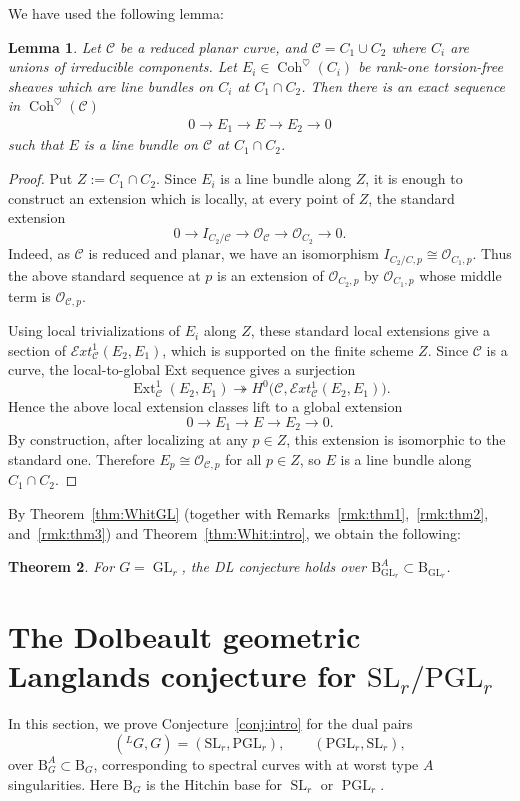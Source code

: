 \documentclass[11pt,oneside,a4paper,mathscr]{amsart}
\newtheorem{thm}{Theorem}[section]
\newtheorem{lemma}[thm]{Lemma}
\theoremstyle{definition}
\newcommand{\cC}{\mathcal{C}}
\newcommand{\rB}{\mathrm{B}}
\newcommand{\Coh}{\operatorname{Coh}}
\newcommand{\Ext}{\operatorname{Ext}}
\newcommand{\GL}{\operatorname{GL}}
\newcommand{\SL}{\operatorname{SL}}
\newcommand{\PGL}{\operatorname{PGL}}
\begin{document}
We have used the following lemma: 
\begin{lemma}\label{lem:line}
Let $\cC$ be a reduced planar curve, and $\cC=C_1 \cup C_2$
where $C_i$ are unions of irreducible components. 
Let $E_i \in \Coh^{\heartsuit}(C_i)$ be rank-one torsion-free 
sheaves which are line bundles on $C_i$ at $C_1 \cap C_2$. Then 
there is an exact sequence in $\Coh^{\heartsuit}(\cC)$
\begin{align*}
    0\to E_1 \to E \to E_2 \to 0
\end{align*}
such that $E$ is a line bundle on $\cC$ at $C_1 \cap C_2$. 
\end{lemma}
\begin{proof}
Put $Z:=C_1\cap C_2$.  Since $E_i$ is a line bundle along $Z$, it is
enough to construct an extension which is locally, at every point of
$Z$, the standard extension
\[
0\to I_{C_2/\cC}\to \mathcal O_{\cC}\to \mathcal O_{C_2}\to 0 .
\]
Indeed, as $\cC$ is reduced and planar, 
we have an isomorphism $I_{C_2/C, p} \cong \mathcal{O}_{C_1, p}$. 
Thus the above standard sequence at $p$ is an extension of
$\mathcal O_{C_2,p}$ by $\mathcal O_{C_1,p}$ whose middle term is
$\mathcal O_{\cC,p}$.

Using local trivializations of $E_i$ along $Z$, these standard local
extensions give a section of
$
\mathcal Ext^1_{\cC}(E_2,E_1)$, 
which is supported on the finite scheme $Z$.  Since $\cC$ is a curve,
the local-to-global Ext sequence gives a surjection
\[
\Ext^1_{\cC}(E_2,E_1)
\twoheadrightarrow
H^0\bigl(\cC,\mathcal Ext^1_{\cC}(E_2,E_1)\bigr).
\]
Hence the above local extension classes lift to a global extension
\[
0\to E_1\to E\to E_2\to 0 .
\]
By construction, after localizing at any $p\in Z$, this extension is
isomorphic to the standard one.  Therefore
$E_p\cong \mathcal O_{\cC,p}$ for all $p\in Z$, so $E$ is a line bundle
along $C_1\cap C_2$.
\end{proof}
By Theorem~\ref{thm:WhitGL} (together with Remarks~\ref{rmk:thm1},~\ref{rmk:thm2}, and~\ref{rmk:thm3}) and Theorem~\ref{thm:Whit:intro}, we obtain the following: 
\begin{thm}\label{thm:GL}
    For $G=\GL_r$, the DL conjecture holds over $\rB_{\GL_r}^A \subset \rB_{\GL_r}$.
\end{thm}

\section[The Dolbeault geometric Langlands conjecture for SLr/PGLr]{The Dolbeault geometric Langlands conjecture for \texorpdfstring{$\mathrm{SL}_r/\mathrm{PGL}_r$}{SLr/PGLr}}
In this section, we prove Conjecture~\ref{conj:intro} for the dual pairs
\[
({}^{L}G,G)=(\mathrm{SL}_r,\mathrm{PGL}_r),\qquad
(\mathrm{PGL}_r,\mathrm{SL}_r),
\]
over $\rB_{G}^{A}\subset \rB_{G}$, corresponding to spectral curves with at worst
type $A$ singularities.
Here $\rB_{G}$ is the Hitchin base for $\SL_r$ or $\PGL_r$.
\end{document}
